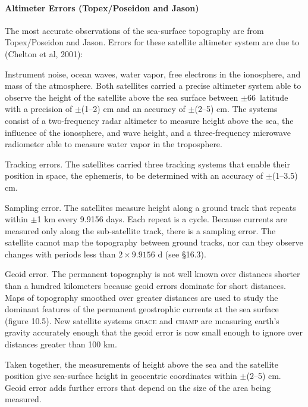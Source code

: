 \paragraph{Altimeter Errors (Topex/Poseidon and Jason)}
The most accurate observations of the sea-surface topography are from Topex/Poseidon and Jason. Errors for these satellite altimeter system are due to (Chelton et al, 2001):
\begin{enumerate}
\vitem Instrument noise, ocean waves, water vapor, free electrons in the ionosphere, and mass of the atmosphere. Both satellites carried a precise altimeter system able to observe the height of the satellite above the sea surface between $\pm$66\degrees\  latitude with a precision of $\pm$(1--2) cm and an accuracy of $\pm$(2--5) cm. The systems consist of a two-frequency radar altimeter to measure height above the sea, the influence of the ionosphere, and wave height, and a three-frequency microwave radiometer able to measure water vapor in the troposphere.

\vitem Tracking errors. The satellites carried three tracking systems that enable their position in space, the ephemeris, to be determined with an accuracy of $\pm$(1--3.5) cm.

\vitem Sampling error. The satellites measure height along a ground track that repeats within $\pm$1 km every 9.9156 days. Each repeat is a cycle. Because currents are measured only
along the sub-satellite track, there is a sampling error. The satellite
cannot map the topography between ground tracks, nor can they observe changes with
periods less than $2 \times 9.9156$ d (see \S 16.3).

\vitem Geoid error. The permanent topography is not well known over distances
shorter than a hundred kilometers because geoid errors dominate for short distances. Maps of
topography smoothed over greater distances are used to study the dominant features of the permanent geostroph\-ic currents at the sea surface (figure 10.5). New satellite systems \textsc{grace}  and \textsc{champ} are measuring earth's gravity accurately enough  that the geoid error is now small enough to ignore over distances greater than 100 km.
\end{enumerate}
Taken together, the measurements of height above the sea and the satellite position give sea-surface height in geocentric coordinates within $\pm$(2--5) cm. Geoid error adds further errors that depend on the size of the area being measured.

